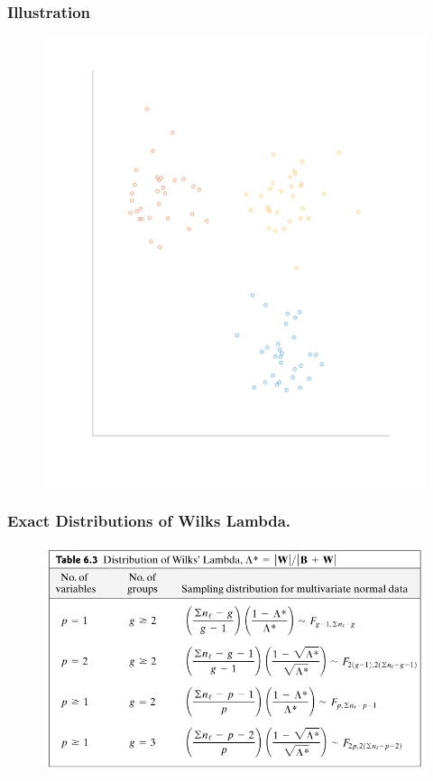 \documentclass[aspectratio=169,10pt,t]{beamer}
\begin{document}
\begin{frame}[t]
    \frametitle{Illustration}
    \begin{figure}[H]
    \includegraphics[scale=0.28]{clusters.png}
    \end{figure} 
\end{frame}
\begin{frame}[t]
    \frametitle{Exact Distributions of Wilks Lambda.}
    
    \begin{figure}[H]
    \centering
    \includegraphics[scale=0.3]{images/1.png}
    \end{figure}
\end{frame}
\end{document}

